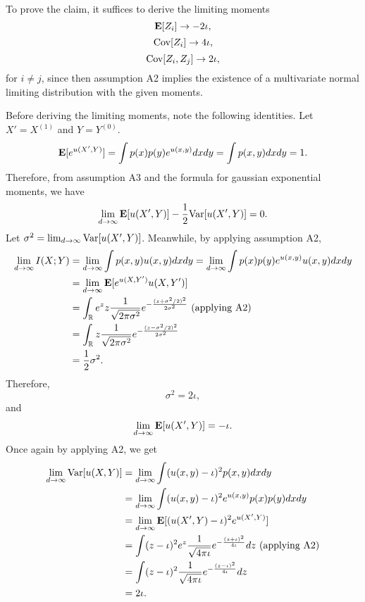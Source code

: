 \documentclass[12pt]{article}
\begin{document}
To prove the claim, it suffices to derive the limiting moments
\[\textbf{E}[Z_i] \to -2\iota,\]
\[\text{Cov}[Z_i] \to 4\iota,\]
\[\text{Cov}[Z_i, Z_j] \to 2\iota,\]
for $i \neq j$,
since then assumption A2 implies the existence of a multivariate normal
limiting distribution with the given moments.

Before deriving the limiting moments, note the following identities.
Let $X' = X^{(1)}$ and $Y = Y^{(0)}$.
\[
\textbf{E}[e^{u(X', Y)}] = \int p(x) p(y) e^{u(x, y)} dx dy = \int p(x, y) dx dy = 1.
\]
Therefore, from assumption A3 and the formula for gaussian exponential
moments, we have
\[
\lim_{d \to \infty} \textbf{E}[u(X', Y)]-\frac{1}{2}\text{Var}[u(X', Y)] = 0.
\]
Let $\sigma^2 = \lim_{d \to \infty} \text{Var}[u(X', Y)]$.
Meanwhile, by applying assumption A2,
\begin{align*}
\lim_{d \to \infty} I(X; Y) &= \lim_{d \to \infty} \int p(x, y) u(x, y) dx dy 
= \lim_{d \to \infty} \int p(x) p(y) e^{u(x, y)} u(x, y) dx dy
\\&= \lim_{d \to \infty}  \textbf{E}[e^{u(X, Y')}u(X, Y')]
\\&= \int_{\mathbb{R}} e^z z \frac{1}{\sqrt{2\pi \sigma^2}} 
e^{-\frac{(z + \sigma^2/2)^2}{2\sigma^2}} \text{ (applying A2)}
\\&= \int_{\mathbb{R}} z \frac{1}{\sqrt{2\pi \sigma^2}} 
e^{-\frac{(z - \sigma^2/2)^2}{2\sigma^2}}
\\&= \frac{1}{2}\sigma^2.
\end{align*}
Therefore,
\[
\sigma^2 = 2\iota,
\]
and
\[
\lim_{d \to \infty} \textbf{E}[u(X', Y)] = -\iota.
\]
Once again by applying A2, we get
\begin{align*}
\lim_{d \to \infty} \text{Var}[u(X, Y)] 
&= \lim_{d \to \infty} \int (u(x, y) - \iota)^2 p(x, y) dx dy
\\&= \lim_{d \to \infty} \int (u(x, y) - \iota)^2 e^{u(x, y)} p(x) p(y) dx dy
\\&= \lim_{d \to \infty} \textbf{E}[(u(X', Y) - \iota)^2 e^{u(X', Y)}] 
\\&= \int (z - \iota)^2 e^z \frac{1}{\sqrt{4\pi\iota}} e^{-\frac{(z+\iota)^2}{4\iota}} dz \text{ (applying A2)}
\\&= \int (z - \iota)^2 \frac{1}{\sqrt{4\pi\iota}} e^{-\frac{(z-\iota)^2}{4\iota}} dz
\\&= 2\iota.
\end{align*}
\end{document}
